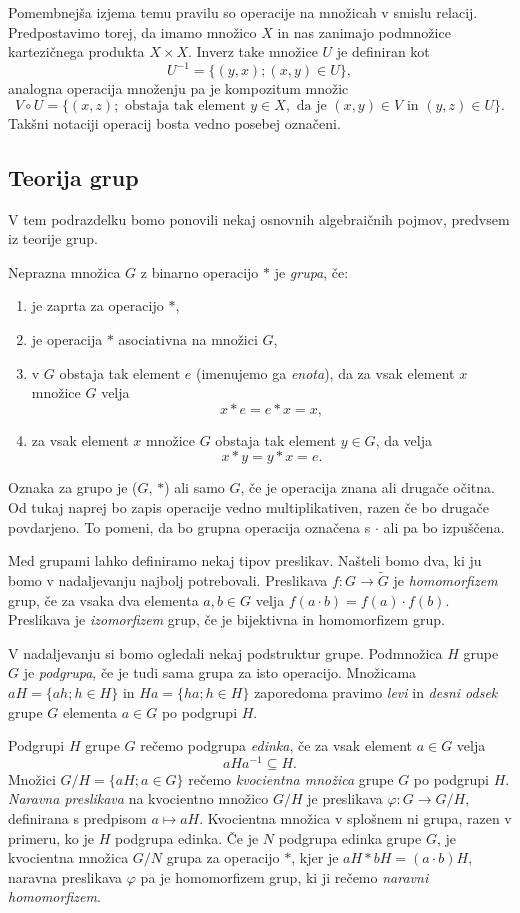 \documentclass[mat1]{fmfdelo}
\begin{document}
Pomembnejša izjema temu pravilu so operacije na množicah v smislu relacij. Predpostavimo torej, da imamo množico $X$ in nas zanimajo podmnožice kartezičnega produkta $X \times X$. Inverz take množice $U$ je definiran kot \[ U^{-1} = \lbrace (y, x) ; (x, y) \in U \rbrace, \]
analogna operacija množenju pa je kompozitum množic \[ V \circ U = \lbrace (x, z) ; \text{ obstaja tak element } y \in X, \text{ da je } (x, y) \in V \text{ in } (y, z) \in U \rbrace. \]
Takšni notaciji operacij bosta vedno posebej označeni.

\subsection{Teorija grup}
V tem podrazdelku bomo ponovili nekaj osnovnih algebraičnih pojmov, predvsem iz teorije grup.

Neprazna množica $G$ z binarno operacijo $*$ je \emph{grupa}, če:
\begin{enumerate}
\item je zaprta za operacijo $*$,
\item je operacija $*$ asociativna na množici $G$,
\item v $G$ obstaja tak element $e$ (imenujemo ga \emph{enota}), da za vsak element $x$ množice $G$ velja \[ x*e = e*x = x, \]
\item za vsak element $x$ množice $G$ obstaja tak element $y \in G$, da velja \[ x*y = y*x = e. \]
\end{enumerate}
Oznaka za grupo je ($G$, $*$) ali samo $G$, če je operacija znana ali drugače očitna. Od tukaj naprej bo zapis operacije vedno multiplikativen, razen če bo drugače povdarjeno. To pomeni, da bo grupna operacija označena s $\cdot$ ali pa bo izpuščena.

Med grupami lahko definiramo nekaj tipov preslikav. Našteli bomo dva, ki ju bomo v nadaljevanju najbolj potrebovali.
Preslikava $f\colon G \to \widetilde{G}$ je \emph{homomorfizem} grup, če za vsaka dva elementa $a, b \in G$ velja $f(a\cdot b) = f(a)\cdot f(b)$.
Preslikava je \emph{izomorfizem} grup, če je bijektivna in homomorfizem grup.

V nadaljevanju si bomo ogledali nekaj podstruktur grupe.
Podmnožica $H$ grupe $G$ je \emph{podgrupa}, če je tudi sama grupa za isto operacijo.
Množicama $aH = \lbrace ah ; h \in H \rbrace$ in $Ha = \lbrace ha ; h \in H \rbrace$ zaporedoma pravimo \emph{levi} in \emph{desni odsek} grupe $G$ elementa $a \in G$ po podgrupi $H$.

Podgrupi $H$ grupe $G$ rečemo podgrupa \emph{edinka}, če za vsak element $a \in G$ velja \[aHa^{-1} \subseteq H.\]
Množici $G/H = \lbrace aH ; a \in G \rbrace$ rečemo \emph{kvocientna množica} grupe $G$ po podgrupi $H$.
\emph{Naravna preslikava} na kvocientno množico $G/H$ je preslikava $\varphi\colon G \to G/H$, definirana s predpisom $a \mapsto aH$.
Kvocientna množica v splošnem ni grupa, razen v primeru, ko je $H$ podgrupa edinka.
Če je $N$ podgrupa edinka grupe $G$, je kvocientna množica $G/N$ grupa za operacijo $*$, kjer je $aH*bH = (a\cdot b)H$, naravna preslikava $\varphi$ pa je homomorfizem grup, ki ji rečemo \emph{naravni homomorfizem}.
\end{document}
